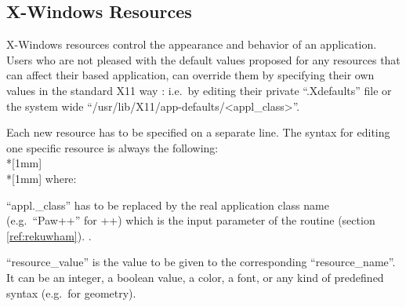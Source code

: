  
\subsection{\KUIPMotif{} X-Windows Resources}
\label{ref:rekmres}

X-Windows resources control the appearance and behavior of an application.
Users who are not pleased with the default values proposed for any resources 
that can affect their \KUIPMotif{} based application, can override them 
by specifying their own values in the standard X11 way : i.e.\ by editing
their private ``.Xdefaults'' file or the system wide 
``/usr/lib/X11/app-defaults/<appl\_class>''.

Each new resource has to be specified on a separate line. The syntax for 
editing one specific resource is always the following:
\\*[1mm]\mbox{}\\*[1mm]
where:
\begin{UL}
\item 
``appl.\_class'' has to be replaced by the real application class name 
(e.g.\ ``Paw++'' for \PAW++{}) which is the input parameter of the routine
\ifKUIPman
   (section \ref{ref:rekuwham}).
\else
  .
\fi
\item
``resource\_value'' is the value to be given to the corresponding 
``resource\_name''. It can be an integer, a boolean value,
a color, a font, or any kind of predefined syntax (e.g.\ for geometry).
\end{UL}

